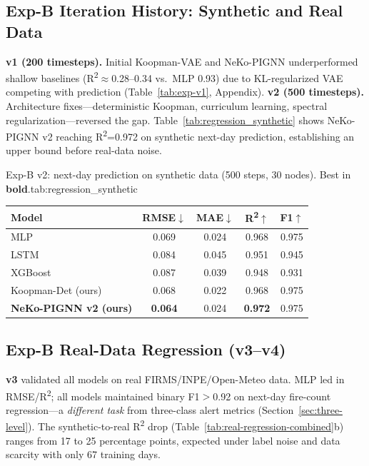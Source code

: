 \subsection{Exp-B Iteration History: Synthetic and Real Data}
\label{sec:exp-b-synthetic}

\textbf{v1 (200 timesteps).} Initial Koopman-VAE and NeKo-PIGNN underperformed shallow baselines (R\textsuperscript{2}$\approx$0.28--0.34 vs.\ MLP 0.93) due to KL-regularized VAE competing with prediction (Table~\ref{tab:exp-v1}, Appendix). \textbf{v2 (500 timesteps).} Architecture fixes---deterministic Koopman, curriculum learning, spectral regularization---reversed the gap. Table~\ref{tab:regression_synthetic} shows NeKo-PIGNN v2 reaching R\textsuperscript{2}=0.972 on synthetic next-day prediction, establishing an upper bound before real-data noise.

\begin{resulttable}{Exp-B v2: next-day prediction on synthetic data (500 steps, 30 nodes). Best in \textbf{bold}.}{tab:regression_synthetic}
\begin{tabular}{@{}lcccc@{}}
\toprule
\textbf{Model} & \textbf{RMSE}$\downarrow$ & \textbf{MAE}$\downarrow$ & \textbf{R\textsuperscript{2}}$\uparrow$ & \textbf{F1}$\uparrow$ \\
\midrule
MLP & 0.069 & 0.024 & 0.968 & 0.975 \\
LSTM & 0.084 & 0.045 & 0.951 & 0.945 \\
XGBoost & 0.087 & 0.039 & 0.948 & 0.931 \\
Koopman-Det (ours) & 0.068 & 0.022 & 0.968 & 0.975 \\
\textbf{NeKo-PIGNN v2 (ours)} & \textbf{0.064} & 0.024 & \textbf{0.972} & 0.975 \\
\bottomrule
\end{tabular}
\end{resulttable}

\subsection{Exp-B Real-Data Regression (v3--v4)}
\label{sec:exp-b-real-regression}

\textbf{v3} validated all models on real FIRMS/INPE/Open-Meteo data. MLP led in RMSE/R\textsuperscript{2}; all models maintained binary F1$>$0.92 on next-day fire-count regression---a \emph{different task} from three-class alert metrics (Section~\ref{sec:three-level}). The synthetic-to-real R\textsuperscript{2} drop (Table~\ref{tab:real-regression-combined}b) ranges from 17 to 25 percentage points, expected under label noise and data scarcity with only 67 training days.

